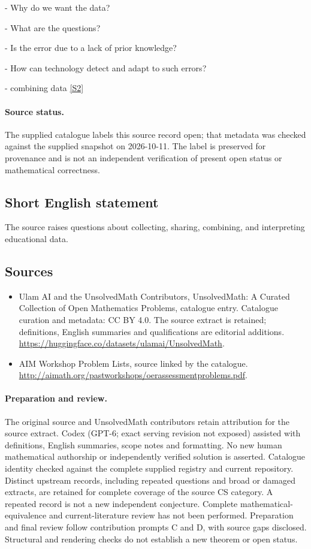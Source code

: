 \documentclass[11pt]{article}
\newcommand{\sref}[2]{\hyperlink{source:#1:#2}{[S#2]}}
\begin{document}
- Why do we want the data?

- What are the questions?

- Is the error due to a lack of prior knowledge?

- How can technology detect and adapt to such errors?

- combining data \sref{statement}{2}
\paragraph{Source status.}
The supplied catalogue labels this source record open; that metadata was checked against the supplied snapshot on 2026-10-11. The label is preserved for provenance and is not an independent verification of present open status or mathematical correctness.
\subsection{Short English statement}
The source raises questions about collecting, sharing, combining, and interpreting educational data.
\subsection{Sources}
\begin{itemize}
\item[\hypertarget{source:statement:1}{S1}] Ulam AI and the UnsolvedMath Contributors, UnsolvedMath: A Curated Collection of Open Mathematics Problems, catalogue entry. Catalogue curation and metadata: CC BY 4.0. The source extract is retained; definitions, English summaries and qualifications are editorial additions.
\url{https://huggingface.co/datasets/ulamai/UnsolvedMath}.
\item[\hypertarget{source:statement:2}{S2}] AIM Workshop Problem Lists, source linked by the catalogue.
\url{http://aimath.org/pastworkshops/oerassessmentproblems.pdf}.
\end{itemize}
\paragraph{Preparation and review.}
The original source and UnsolvedMath contributors retain attribution for the source extract. Codex (GPT-6; exact serving revision not exposed) assisted with definitions, English summaries, scope notes and formatting. No new human mathematical authorship or independently verified solution is asserted. Catalogue identity checked against the complete supplied registry and current repository. Distinct upstream records, including repeated questions and broad or damaged extracts, are retained for complete coverage of the source CS category. A repeated record is not a new independent conjecture. Complete mathematical-equivalence and current-literature review has not been performed. Preparation and final review follow contribution prompts C and D, with source gaps disclosed. Structural and rendering checks do not establish a new theorem or open status.
\label{end:statement}
\end{document}
